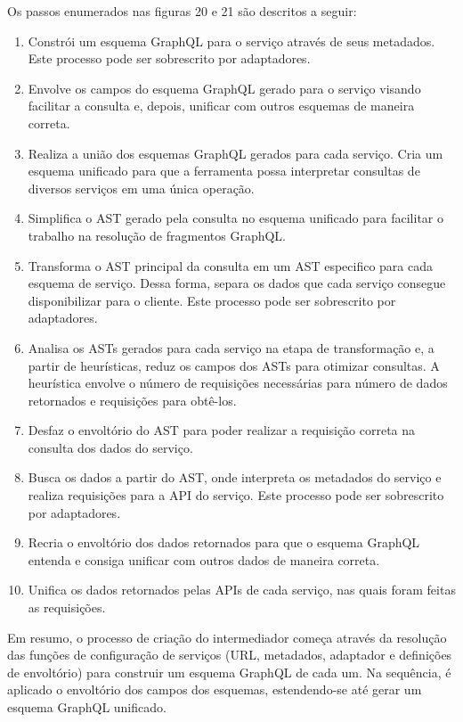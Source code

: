 Os passos enumerados nas figuras 20 e 21 são descritos a seguir:

\begin{enumerate}
  \item Constrói um esquema GraphQL para o serviço através de seus metadados. Este processo pode ser sobrescrito por adaptadores.
  \item Envolve os campos do esquema GraphQL gerado para o serviço visando facilitar a consulta e, depois, unificar com outros esquemas de maneira correta.
  \item Realiza a união dos esquemas GraphQL gerados para cada serviço. Cria um esquema unificado para que a ferramenta possa interpretar consultas de diversos serviços em uma única operação.
  \item Simplifica o AST gerado pela consulta no esquema unificado para facilitar o trabalho na resolução de fragmentos GraphQL.
  \item Transforma o AST principal da consulta em um AST especifico para cada esquema de serviço. Dessa forma, separa os dados que cada serviço consegue disponibilizar para o cliente. Este processo pode ser sobrescrito por adaptadores.
  \item Analisa os ASTs gerados para cada serviço na etapa de transformação e, a partir de heurísticas, reduz os campos dos ASTs para otimizar consultas. A heurística envolve o número de requisições necessárias para número de dados retornados e requisições para obtê-los.
  \item Desfaz o envoltório do AST para poder realizar a requisição correta na consulta dos dados do serviço.
  \item Busca os dados a partir do AST, onde interpreta os metadados do serviço e realiza requisições para a API do serviço. Este processo pode ser sobrescrito por adaptadores.
  \item Recria o envoltório dos dados retornados para que o esquema GraphQL entenda e consiga unificar com outros dados de maneira correta.
  \item Unifica os dados retornados pelas APIs de cada serviço, nas quais foram feitas as requisições.
\end{enumerate}

Em resumo, o processo de criação do intermediador começa através da resolução das funções de configuração de serviços (URL, metadados, adaptador e definições de envoltório) para construir um esquema GraphQL de cada um. Na sequência, é aplicado o envoltório dos campos dos esquemas, estendendo-se até gerar um esquema GraphQL unificado.

